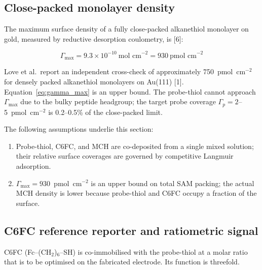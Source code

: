 \documentclass[10pt,a4paper]{article}
\numberwithin{equation}{section}
\newcommand{\cit}[1]{[#1]}   %
\begin{document}
\subsection{Close-packed monolayer density}

The maximum surface density of a fully close-packed alkanethiol monolayer on gold,
measured by reductive desorption coulometry, is \cit{6}:

\begin{equation}
  \Gamma_{\max} = 9.3 \times 10^{-10}\ \text{mol~cm}^{-2} = 930\ \text{pmol~cm}^{-2}
  \label{eq:gamma_max}
\end{equation}

Love et al.\ report an independent cross-check of approximately
750~pmol~cm$^{-2}$ for densely packed alkanethiol monolayers on Au(111) \cit{1}.
Equation~\eqref{eq:gamma_max} is an upper bound. The probe-thiol cannot approach
$\Gamma_{\max}$ due to the bulky peptide headgroup; the target probe coverage
$\Gamma_p = 2$--5~pmol~cm$^{-2}$ is 0.2--0.5\% of the close-packed limit.

The following assumptions underlie this section:

\begin{enumerate}[noitemsep]
  \item Probe-thiol, C6FC, and MCH are co-deposited from a single mixed solution;
    their relative surface coverages are governed by competitive Langmuir adsorption.
  \item $\Gamma_{\max} = 930$~pmol~cm$^{-2}$ is an upper bound on total SAM packing;
    the actual MCH density is lower because probe-thiol and C6FC occupy a fraction of
    the surface.
\end{enumerate}

\subsection{C6FC reference reporter and ratiometric signal}
\label{sec:c6fc}

C6FC (Fc--(CH$_2$)$_6$--SH) is co-immobilised with the probe-thiol at a molar ratio
that is to be optimised on the fabricated electrode. Its function is threefold.
\end{document}
